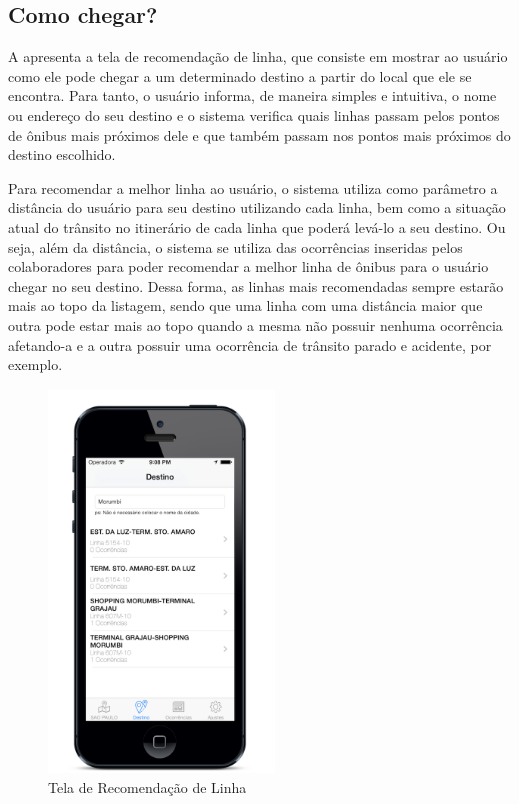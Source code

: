 \subsection{Como chegar?}

A  apresenta a tela de recomendação de linha, que consiste em mostrar ao usuário como ele pode chegar a um determinado destino a partir do local que ele se encontra. Para tanto, o usuário informa, de maneira simples e intuitiva, o nome ou endereço do seu destino e o sistema verifica quais linhas passam pelos pontos de ônibus mais próximos dele e que também passam nos pontos mais próximos do destino escolhido. 
	
Para recomendar a melhor linha ao usuário, o sistema utiliza como parâmetro a distância do usuário para seu destino utilizando cada linha, bem como a situação atual do trânsito no itinerário de cada linha que poderá levá-lo a seu destino. Ou seja, além da distância, o sistema se  utiliza das ocorrências inseridas pelos colaboradores para poder recomendar a melhor linha de ônibus para o usuário chegar no seu destino. Dessa forma, as linhas mais recomendadas sempre estarão mais ao topo da listagem, sendo que uma linha com uma distância maior que outra pode estar mais ao topo quando a mesma não possuir nenhuma ocorrência afetando-a e a outra possuir uma ocorrência de trânsito parado e acidente, por exemplo.
	
\begin{figure}[htp]
\begin{center}
  \includegraphics[width=6cm]{images/telas/comoChegar.png}
  \caption{Tela de Recomendação de Linha}
  \label{fig:telaRecomendacao}
\end{center}
\end{figure}

